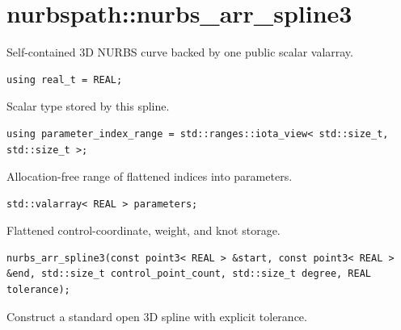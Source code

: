 \section{nurbspath::nurbs\_arr\_spline3}
Self-contained 3D NURBS curve backed by one public scalar valarray.
\par\noindent\begin{minipage}{\linewidth}
\begin{lstlisting}[style=apireference]
using real_t = REAL;
\end{lstlisting}
{\footnotesize Scalar type stored by this spline.\par}
\end{minipage}\par\vspace{1pt}
\par\noindent\begin{minipage}{\linewidth}
\begin{lstlisting}[style=apireference]
using parameter_index_range = std::ranges::iota_view< std::size_t, std::size_t >;
\end{lstlisting}
{\footnotesize Allocation-free range of flattened indices into parameters.\par}
\end{minipage}\par\vspace{1pt}
\par\noindent\begin{minipage}{\linewidth}
\begin{lstlisting}[style=apireference]
std::valarray< REAL > parameters;
\end{lstlisting}
{\footnotesize Flattened control-coordinate, weight, and knot storage.\par}
\end{minipage}\par\vspace{1pt}
\par\noindent\begin{minipage}{\linewidth}
\begin{lstlisting}[style=apireference]
nurbs_arr_spline3(const point3< REAL > &start, const point3< REAL > &end, std::size_t control_point_count, std::size_t degree, REAL tolerance);
\end{lstlisting}
{\footnotesize Construct a standard open 3D spline with explicit tolerance.\par}
\end{minipage}\par\vspace{1pt}
